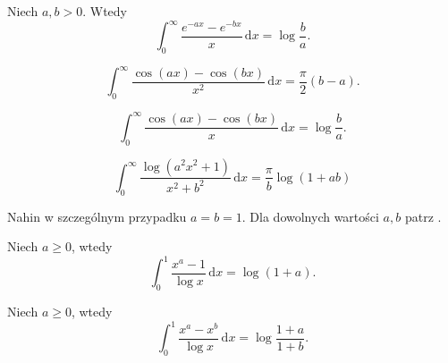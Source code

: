 \begin{problem}
    Niech $a, b > 0$.
    Wtedy
    \begin{equation}
        \int_0^\infty \frac{e^{-ax} - e^{-bx}}{x} \,\mathrm{d}x = \log \frac b a.
    \end{equation}
\end{problem}

\begin{problem}
    \begin{equation}
        \int_0^\infty \frac{\cos (ax) - \cos (bx)}{x^2} \,\mathrm{d}x = \frac \pi 2 (b - a).
    \end{equation}
\end{problem}

\begin{problem}
    \begin{equation}
        \int_0^\infty \frac{\cos (ax) - \cos (bx)}{x} \,\mathrm{d}x = \log \frac b a.
    \end{equation}
\end{problem}

\begin{problem}
    \begin{equation}
        \int_0^\infty \frac{\log (a^2 x^2 + 1)}{x^2 + b^2} \,\mathrm{d}x = \frac \pi b \log (1 + ab)
    \end{equation}
\end{problem}

\begin{solution}
    Nahin \cite[s. 67]{nahin15} w szczególnym przypadku $a = b = 1$.
    Dla dowolnych wartości $a, b$ patrz \cite[s. 114, 375]{nahin15}.
\end{solution}

\begin{problem}
    Niech $a \ge 0$, wtedy
    \begin{equation}
        \int_0^1 \frac{x^a - 1}{\log x} \,\mathrm{d}x = \log(1+a).
    \end{equation}
\end{problem}

\begin{problem}
    Niech $a \ge 0$, wtedy
    \begin{equation}
        \int_0^1 \frac{x^a - x^b}{\log x} \,\mathrm{d}x = \log \frac{1+a}{1+b}.
    \end{equation}
\end{problem}

